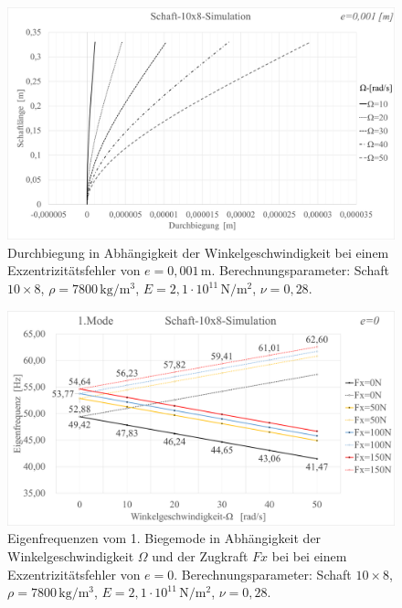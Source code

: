 	\begin{figure}[H]
		\centering
		\includegraphics[width=0.95\linewidth, height=0.40\textheight]{Ergebnisse/Schaft_10x8_Biegung_Simu} 
		\caption{Durchbiegung in Abhängigkeit der Winkelgeschwindigkeit bei einem Exzentrizitätsfehler von $ e=0,001\,\text{m}$. Berechnungsparameter: Schaft $ 10\times8 $, $\rho = 7800 \,\text{kg}/\text{m}^{3} $, $ E=2,1\cdot 10^{11} \,\text{N}/\text{m}^{2} $, $ \nu=0,28 $.}
		\label{fig:Result-Schaft-10x8-Simulation-Durchbiegung}
	\end{figure}

	
	\begin{figure}[H]
		\centering
		\includegraphics[width=0.93\linewidth, height=0.33\textheight]{Ergebnisse/Schaft_10x8_Zugkraft_Simu} 
		\caption{Eigenfrequenzen vom 1. Biegemode in Abhängigkeit der Winkelgeschwindigkeit $ \Omega $ und der Zugkraft $ Fx $ bei bei einem Exzentrizitätsfehler von $ e=0 $. Berechnungsparameter: Schaft $ 10\times8 $, $\rho = 7800 \,\text{kg}/\text{m}^{3} $, $ E=2,1\cdot 10^{11} \,\text{N}/\text{m}^{2} $, $ \nu=0,28 $.}
		\label{fig:Result-Schaft-10x8-Simulation-Zugkraft}
	\end{figure}
	
